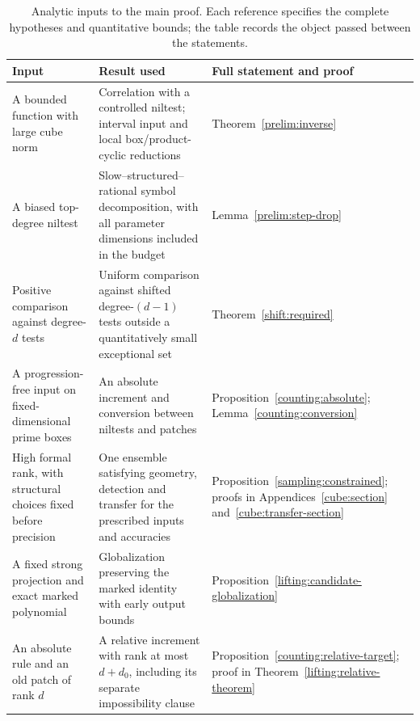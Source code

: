 \begin{table}[htbp]
\centering\small
\begin{tabular}{@{}p{.23\linewidth}p{.42\linewidth}p{.27\linewidth}@{}}
\toprule
Input & Result used & Full statement and proof \\
\midrule
A bounded function with large cube norm
& Correlation with a controlled niltest; interval input and local
box/product-cyclic reductions
& Theorem~\ref{prelim:inverse} \\[4pt]
A biased top-degree niltest
& Slow--structured--rational symbol decomposition, with all parameter
dimensions included in the budget
& Lemma~\ref{prelim:step-drop} \\[4pt]
Positive comparison against degree-$d$ tests
& Uniform comparison against shifted degree-$(d-1)$ tests outside a
quantitatively small exceptional set
& Theorem~\ref{shift:required} \\[4pt]
A progression-free input on fixed-dimensional prime boxes
& An absolute increment and conversion between niltests and patches
& Proposition~\ref{counting:absolute};
Lemma~\ref{counting:conversion} \\[4pt]
High formal rank, with structural choices fixed before precision
& One ensemble satisfying geometry, detection and transfer for the
prescribed inputs and accuracies
& Proposition~\ref{sampling:constrained}; proofs in
Appendices~\ref{cube:section} and~\ref{cube:transfer-section} \\[4pt]
A fixed strong projection and exact marked polynomial
& Globalization preserving the marked identity with early output bounds
& Proposition~\ref{lifting:candidate-globalization} \\[4pt]
An absolute rule and an old patch of rank $d$
& A relative increment with rank at most $d+d_0$, including its
separate impossibility clause
& Proposition~\ref{counting:relative-target}; proof in
Theorem~\ref{lifting:relative-theorem} \\
\bottomrule
\end{tabular}
\caption{Analytic inputs to the main proof. Each reference specifies the
complete hypotheses and quantitative bounds; the table records the
object passed between the statements.}
\label{ap:interface-table}
\end{table}

